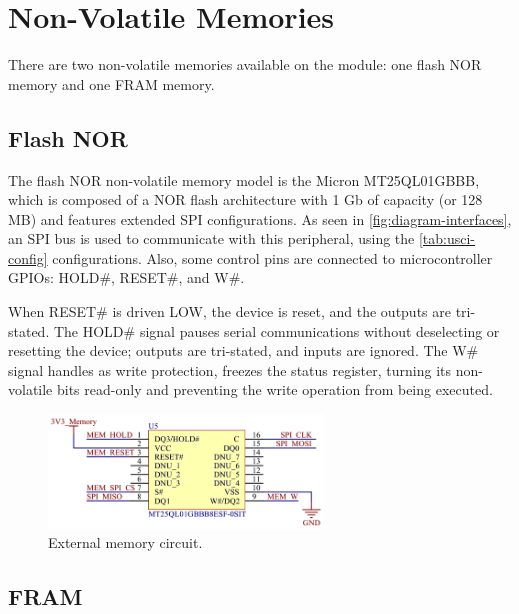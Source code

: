 \section{Non-Volatile Memories}

There are two non-volatile memories available on the module: one flash NOR memory and one FRAM memory.

\subsection{Flash NOR}

The flash NOR non-volatile memory model is the Micron MT25QL01GBBB, which is composed of a NOR flash architecture with 1 Gb of capacity (or 128 MB) and features extended SPI configurations. As seen in \autoref{fig:diagram-interfaces}, an SPI bus is used to communicate with this peripheral, using the \autoref{tab:usci-config} configurations. Also, some control pins are connected to microcontroller GPIOs: HOLD\#, RESET\#, and W\#.

When RESET\# is driven LOW, the device is reset, and the outputs are tri-stated. The HOLD\# signal pauses serial communications without deselecting or resetting the device; outputs are tri-stated, and inputs are ignored. The W\# signal handles as write protection, freezes the status register, turning its non-volatile bits read-only and preventing the write operation from being executed.


\begin{figure}[!ht]
    \begin{center}
        \includegraphics[width=0.65\textwidth]{figures/ext-memory-circuit.png}
        \caption{External memory circuit.}
        \label{fig:ext-mem-circuit}
    \end{center}
\end{figure}

\subsection{FRAM}

